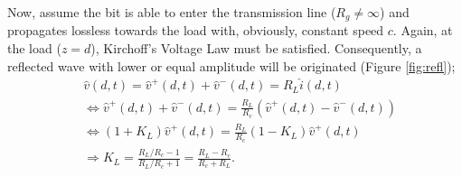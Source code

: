 Now, assume the bit is able to enter the transmission line ($R_g \neq \infty$) and propagates lossless towards the load with, obviously, constant speed $c$. Again, at the load ($z=d$), Kirchoff's Voltage Law must be satisfied. Consequently, a reflected wave with lower or equal amplitude will be originated (Figure \ref{fig:refl});
\begin{align}
&\hat{v}(d, t) = \hat{v}^{+}(d, t) + \hat{v}^{-}(d, t) = R_L\hat{i}(d, t) \\
&\Leftrightarrow \hat{v}^{+}(d, t) + \hat{v}^{-}(d, t) = \frac{R_L}{R_c}(\hat{v}^{+}(d, t) - \hat{v}^{-}(d, t)) \\
&\Leftrightarrow (1 + K_L)\hat{v}^{+}(d, t) = \frac{R_L}{R_c}(1 - K_L)\hat{v}^{+}(d, t) \\
&\Rightarrow K_L = \frac{R_L/R_c - 1}{R_L/R_c + 1} = \frac{R_L - R_c}{R_c + R_L}.
\end{align}


